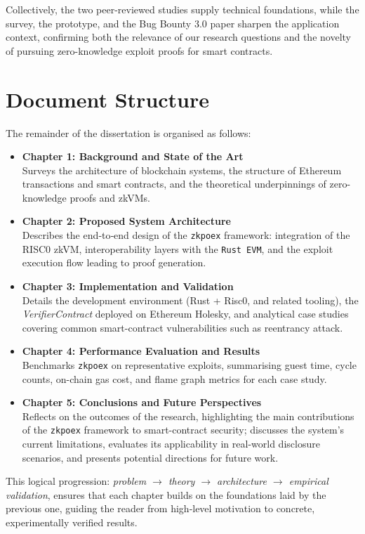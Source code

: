 Collectively, the two peer-reviewed studies supply technical foundations, while the survey, the prototype, and the Bug Bounty 3.0 paper sharpen the application context, confirming both the relevance of our research questions and the novelty of pursuing zero-knowledge exploit proofs for smart contracts.


\section{Document Structure}
The remainder of the dissertation is organised as follows:

\begin{itemize}
    \item \textbf{Chapter 1: Background and State of the Art}\\
          Surveys the architecture of blockchain systems, the structure of Ethereum transactions and smart contracts, and the theoretical underpinnings of zero-knowledge proofs and zkVMs.
    \item \textbf{Chapter 2: Proposed System Architecture}\\
          Describes the end‑to‑end design of the \texttt{zkpoex} framework: integration of the RISC0 zkVM, interoperability layers with the \texttt{Rust EVM}, and the exploit execution flow leading to proof generation.
    \item \textbf{Chapter 3: Implementation and Validation}\\
          Details the development environment (Rust + Risc0, and related tooling), the \textit{VerifierContract} deployed on Ethereum Holesky, and analytical case studies covering common smart-contract vulnerabilities such as reentrancy attack.
    \item \textbf{Chapter 4: Performance Evaluation and Results}\\
          Benchmarks \texttt{zkpoex} on representative exploits, summarising guest time, cycle counts, on-chain gas cost, and flame graph metrics for each case study.
    \item \textbf{Chapter 5: Conclusions and Future Perspectives} \\
          Reflects on the outcomes of the research, highlighting the main contributions of the \texttt{zkpoex} framework to smart-contract security; discusses the system’s current limitations, evaluates its applicability in real-world disclosure scenarios, and presents potential directions for future work.
\end{itemize}

This logical progression: \textit{problem $\rightarrow$ theory $\rightarrow$ architecture $\rightarrow$ empirical validation}, ensures that each chapter builds on the foundations laid by the previous one, guiding the reader from high‑level motivation to concrete, experimentally verified results.

\endgroup
